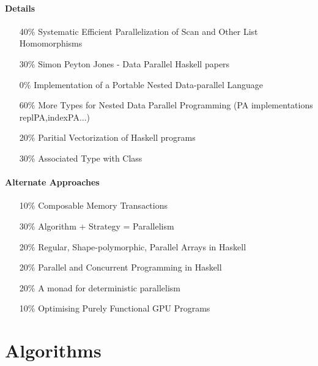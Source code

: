 \documentclass{article}
\begin{document}
    \paragraph{Details}
      \begin{itemize}
        \item[40\%] Systematic Efficient Parallelization of Scan and Other List Homomorphisms \cite{ParScan1996Gorlatch}
        \item[30\%] Simon Peyton Jones - Data Parallel Haskell papers \cite{Simon2013DPHpapers}
        \item[0\%] Implementation of a Portable Nested Data-parallel Language \cite{NepaBelloch1993}
        \item[60\%] More Types for Nested Data Parallel Programming (PA implementations replPA,indexPA...) \cite{TypesNested2000}
        \item[20\%] Paritial Vectorization of Haskell programs \cite{Chakravarty2008Partial}
        \item[30\%] Associated Type with Class \cite{DataFamily2005Chakravarty}
      \end{itemize}
      
    \paragraph{Alternate Approaches}
      \begin{itemize}
        \item[10\%] Composable Memory Transactions \cite{Harris2005Composable}
        \item[30\%] Algorithm + Strategy = Parallelism \cite{Trinder1998Algorithm}
        \item[20\%] Regular, Shape-polymorphic, Parallel Arrays in Haskell \cite{Keller2010Regular}
        \item[20\%] Parallel and Concurrent Programming in Haskell \cite{Marlow2012Parallel}
        \item[20\%] A monad for deterministic parallelism \cite{Marlow2011Monad}
        \item[10\%] Optimising Purely Functional {GPU} Programs \cite{McDonell2013Optimising}
      \end{itemize}
    
  \newpage
  
  \section{Algorithms}
    
\end{document}
